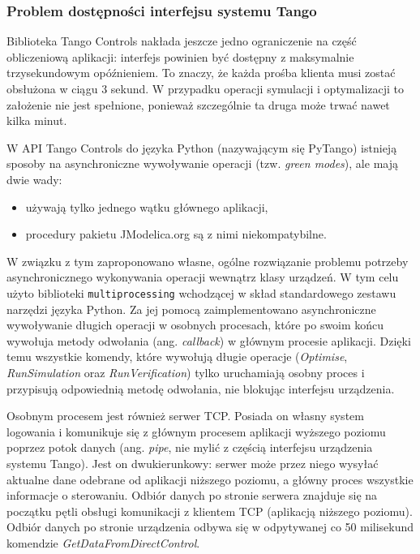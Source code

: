 \subsubsection{Problem dostępności interfejsu systemu Tango}

Biblioteka Tango Controls nakłada jeszcze jedno ograniczenie na część obliczeniową aplikacji: interfejs powinien być dostępny z maksymalnie trzysekundowym opóźnieniem. To znaczy, że każda prośba klienta musi zostać obsłużona w ciągu 3 sekund. W przypadku operacji symulacji i optymalizacji to założenie nie jest spełnione, ponieważ szczególnie ta druga może trwać nawet kilka minut.

W API Tango Controls do języka Python (nazywającym się PyTango) istnieją sposoby na asynchroniczne wywoływanie operacji (tzw. \emph{green modes}), ale mają dwie wady:
\begin{itemize}
    \item używają tylko jednego wątku głównego aplikacji,
    \item procedury pakietu JModelica.org są z nimi niekompatybilne.
\end{itemize}

W związku z tym zaproponowano własne, ogólne rozwiązanie problemu potrzeby asynchronicznego wykonywania operacji wewnątrz klasy urządzeń. W tym celu użyto biblioteki \texttt{multiprocessing} wchodzącej w skład standardowego zestawu narzędzi języka Python. Za jej pomocą zaimplementowano asynchroniczne wywoływanie długich operacji w osobnych procesach, które po swoim końcu wywołuja metody odwołania (ang. \emph{callback}) w głównym procesie aplikacji. Dzięki temu wszystkie komendy, które wywołują długie operacje (\emph{Optimise}, \emph{RunSimulation} oraz \emph{RunVerification}) tylko uruchamiają osobny proces i przypisują odpowiednią metodę odwołania, nie blokując interfejsu urządzenia.

Osobnym procesem jest również serwer TCP. Posiada on własny system logowania i komunikuje się z głównym procesem aplikacji wyższego poziomu poprzez potok danych (ang. \emph{pipe}, nie mylić z częścią interfejsu urządzenia systemu Tango). Jest on dwukierunkowy: serwer może przez niego wysyłać aktualne dane odebrane od aplikacji niższego poziomu, a główny proces wszystkie informacje o sterowaniu. Odbiór danych po stronie serwera znajduje się na początku pętli obsługi komunikacji z klientem TCP (aplikacją niższego poziomu). Odbiór danych po stronie urządzenia odbywa się w odpytywanej co 50 milisekund komendzie \emph{GetDataFromDirectControl}.

